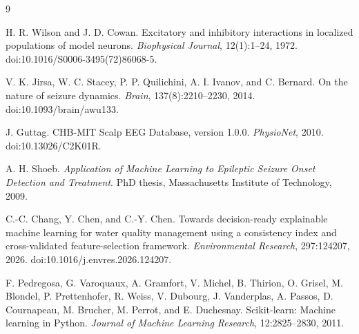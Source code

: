 \documentclass[11pt]{article}
\begin{document}
\begin{thebibliography}{9}

H. R. Wilson and J. D. Cowan.
\newblock Excitatory and inhibitory interactions in localized populations of model neurons.
\newblock \emph{Biophysical Journal}, 12(1):1--24, 1972.
\newblock doi:10.1016/S0006-3495(72)86068-5.

V. K. Jirsa, W. C. Stacey, P. P. Quilichini, A. I. Ivanov, and C. Bernard.
\newblock On the nature of seizure dynamics.
\newblock \emph{Brain}, 137(8):2210--2230, 2014.
\newblock doi:10.1093/brain/awu133.

J. Guttag.
\newblock CHB-MIT Scalp EEG Database, version 1.0.0.
\newblock \emph{PhysioNet}, 2010.
\newblock doi:10.13026/C2K01R.

A. H. Shoeb.
\newblock \emph{Application of Machine Learning to Epileptic Seizure Onset Detection and Treatment}.
\newblock PhD thesis, Massachusetts Institute of Technology, 2009.

C.-C. Chang, Y. Chen, and C.-Y. Chen.
\newblock Towards decision-ready explainable machine learning for water quality management using a consistency index and cross-validated feature-selection framework.
\newblock \emph{Environmental Research}, 297:124207, 2026.
\newblock doi:10.1016/j.envres.2026.124207.

F. Pedregosa, G. Varoquaux, A. Gramfort, V. Michel, B. Thirion, O. Grisel, M. Blondel, P. Prettenhofer, R. Weiss, V. Dubourg, J. Vanderplas, A. Passos, D. Cournapeau, M. Brucher, M. Perrot, and E. Duchesnay.
\newblock Scikit-learn: Machine learning in Python.
\newblock \emph{Journal of Machine Learning Research}, 12:2825--2830, 2011.

\end{thebibliography}
\end{document}
